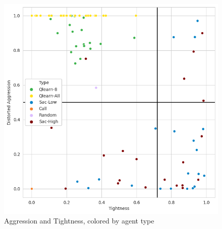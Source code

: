 \begin{figure}[H]
\centering
    \includegraphics[width=0.8\linewidth]{Results/figures/traditional_scatterplot_Type.png}
\caption{Aggression and Tightness, colored by agent type}
\label{AggTightAgentType}
\end{figure}

